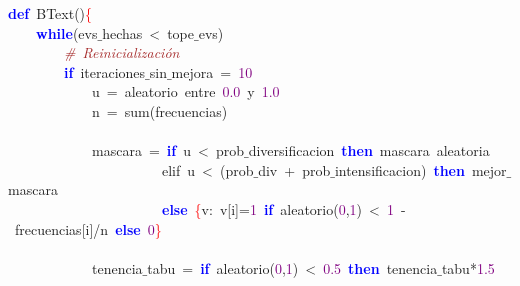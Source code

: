 \noindent
\mbox{}\textbf{\textcolor{Blue}{def}}\ BText\textcolor{BrickRed}{()}\textcolor{Red}{\{} \\
\mbox{}\ \ \ \ \textbf{\textcolor{Blue}{while}}\textcolor{BrickRed}{(}evs$\_$hechas\ \textcolor{BrickRed}{\textless{}}\ tope$\_$evs\textcolor{BrickRed}{)} \\
\mbox{}\ \ \ \ \ \ \ \ \textit{\textcolor{Brown}{\#\ Reinicialización}} \\
\mbox{}\ \ \ \ \ \ \ \ \textbf{\textcolor{Blue}{if}}\ iteraciones$\_$sin$\_$mejora\ \textcolor{BrickRed}{=}\ \textcolor{Purple}{10} \\
\mbox{}\ \ \ \ \ \ \ \ \ \ \ \ u\ \textcolor{BrickRed}{=}\ aleatorio\ entre\ \textcolor{Purple}{0.0}\ y\ \textcolor{Purple}{1.0} \\
\mbox{}\ \ \ \ \ \ \ \ \ \ \ \ n\ \textcolor{BrickRed}{=}\ sum\textcolor{BrickRed}{(}frecuencias\textcolor{BrickRed}{)} \\
\mbox{} \\
\mbox{}\ \ \ \ \ \ \ \ \ \ \ \ mascara\ \textcolor{BrickRed}{=}\ \textbf{\textcolor{Blue}{if}}\ u\ \textcolor{BrickRed}{\textless{}}\ prob$\_$diversificacion\ \textbf{\textcolor{Blue}{then}}\ mascara\ aleatoria \\
\mbox{}\ \ \ \ \ \ \ \ \ \ \ \ \ \ \ \ \ \ \ \ \ \ elif\ u\ \textcolor{BrickRed}{\textless{}}\ \textcolor{BrickRed}{(}prob$\_$div\ \textcolor{BrickRed}{+}\ prob$\_$intensificacion\textcolor{BrickRed}{)}\ \textbf{\textcolor{Blue}{then}}\ mejor$\_$mascara \\
\mbox{}\ \ \ \ \ \ \ \ \ \ \ \ \ \ \ \ \ \ \ \ \ \ \textbf{\textcolor{Blue}{else}}\ \textcolor{Red}{\{}v\textcolor{BrickRed}{:}\ v\textcolor{BrickRed}{[}i\textcolor{BrickRed}{]=}\textcolor{Purple}{1}\ \textbf{\textcolor{Blue}{if}}\ aleatorio\textcolor{BrickRed}{(}\textcolor{Purple}{0}\textcolor{BrickRed}{,}\textcolor{Purple}{1}\textcolor{BrickRed}{)}\ \textcolor{BrickRed}{\textless{}}\ \textcolor{Purple}{1}\ \textcolor{BrickRed}{-}\ frecuencias\textcolor{BrickRed}{[}i\textcolor{BrickRed}{]/}n\ \textbf{\textcolor{Blue}{else}}\ \textcolor{Purple}{0}\textcolor{Red}{\}} \\
\mbox{} \\
\mbox{}\ \ \ \ \ \ \ \ \ \ \ \ tenencia$\_$tabu\ \textcolor{BrickRed}{=}\ \textbf{\textcolor{Blue}{if}}\ aleatorio\textcolor{BrickRed}{(}\textcolor{Purple}{0}\textcolor{BrickRed}{,}\textcolor{Purple}{1}\textcolor{BrickRed}{)}\ \textcolor{BrickRed}{\textless{}}\ \textcolor{Purple}{0.5}\ \textbf{\textcolor{Blue}{then}}\ tenencia$\_$tabu\textcolor{BrickRed}{*}\textcolor{Purple}{1.5} \\

